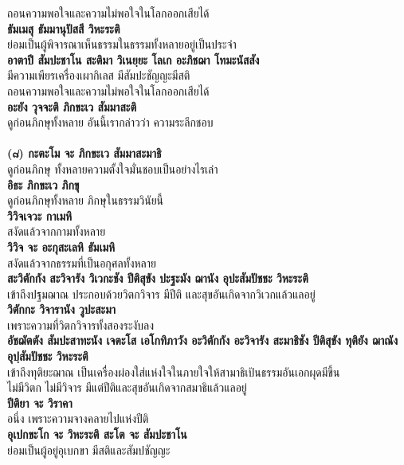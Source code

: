 \documentclass[12pt]{article}
\begin{document}
\indent ถอนความพอใจและความไม่พอใจในโลกออกเสียได้\\
\textbf{ธัมเมสุ ธัมมานุปัสสี วิหะระติ}\\
\indent ย่อมเป็นผู้พิจารณาเห็นธรรมในธรรมทั้งหลายอยู่เป็นประจำ\\
\textbf{อาตาปี สัมปะชาโน สะติมา วิเนยฺยะ โลเก อะภิชฌา โทมะนัสสัง}\\
\indent มีความเพียรเครื่องเผากิเลส มีสัมปะชัญญะมีสติ \\
\indent ถอนความพอใจและความไม่พอใจในโลกออกเสียได้\\
\textbf{อะยัง วุจจะติ ภิกขะเว สัมมาสะติ}\\
\indent ดูก่อนภิกษุทั้งหลาย อันนี้เรากล่าวว่า ความระลึกชอบ\\
\\
\textbf{(๘) กะตะโม จะ ภิกขะเว สัมมาสะมาธิ}\\
\indent ดูก่อนภิกษุ ทั้งหลายความตั้งใจมั่นชอบเป็นอย่างไรเล่า\\
\textbf{อิธะ ภิกขะเว ภิกขุ}\\
\indent ดูก่อนภิกษุทั้งหลาย ภิกษุในธรรมวินัยนี้\\
\textbf{วิวิจเจวะ กาเมหิ}\\
\indent สงัดแล้วจากกามทั้งหลาย\\
\textbf{วิวิจ จะ อะกุสะเลหิ ธัมเมหิ}\\
\indent สงัดแล้วจากธรรมที่เป็นอกุศลทั้งหลาย\\
\textbf{สะวิตักกัง สะวิจารัง วิเวกะชัง ปีติสุขัง ปะฐะมัง ฌานัง อุปะสัมปัชชะ วิหะระติ}\\
\indent เข้าถึงปฐมฌาณ ประกอบด้วยวิตกวิจาร มีปีติ และสุขอันเกิดจากวิเวกแล้วแลอยู่\\
\textbf{วิตักกะ วิจารานัง วูปะสะมา}\\
\indent เพราะความที่วิตกวิจารทั้งสองระงับลง\\
\textbf{อัชฌัตตัง สัมปะสาทะนัง เจตะโส เอโกทิภาวัง 
\indent อะวิตักกัง อะวิจารัง สะมาธิชัง ปีติสุขัง ทุติยัง ฌาณัง อุปฺสัมปัชชะ วิหะระติ}\\
\indent เข้าถึงทุติยะฌาณ เป็นเครื่องผ่องใส่แห่งใจในภายใจให้สามาธิเป้นธรรมอันเอกผุดมีขึ้น \\
\indent ไม่มีวิตก ไม่มีวิจาร มีแต่ปีติและสุขอันเกิดจากสมาธิแล้วแลอยู่\\
\textbf{ปีติยา จะ วิราคา}\\
\indent อนึ่ง เพราะความจางคลายไปแห่งปีติ\\
\textbf{อุเปกขะโก จะ วิหะระติ สะโต จะ สัมปะชาโน}\\
\indent ย่อมเป็นผู้อยู่อุเบกขา มีสติและสัมปชัญญะ\\
\end{document}
